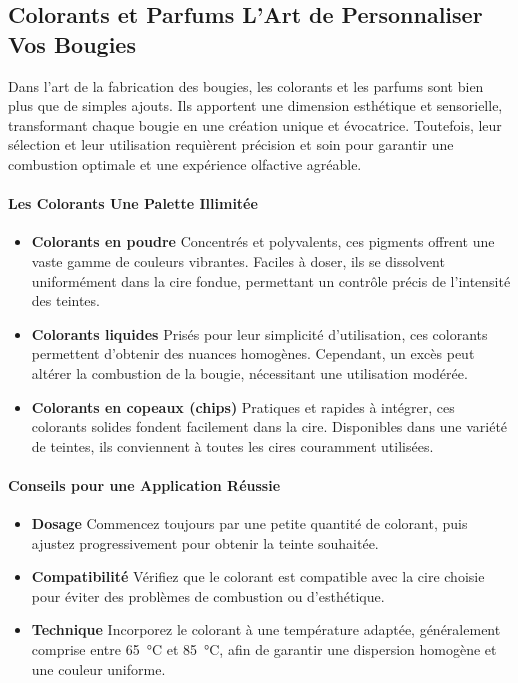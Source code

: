 \documentclass[11pt,fleqn,onecolumn,oneside]{book}
\begin{document}
\subsection*{Colorants et Parfums L’Art de Personnaliser Vos Bougies}

\begin{definition}
Dans l’art de la fabrication des bougies, les colorants et les parfums sont bien plus que de simples ajouts. Ils apportent une dimension esthétique et sensorielle, transformant chaque bougie en une création unique et évocatrice. Toutefois, leur sélection et leur utilisation requièrent précision et soin pour garantir une combustion optimale et une expérience olfactive agréable.
\end{definition}

\paragraph{Les Colorants Une Palette Illimitée}

\begin{itemize}
    \item \textbf{Colorants en poudre} Concentrés et polyvalents, ces pigments offrent une vaste gamme de couleurs vibrantes. Faciles à doser, ils se dissolvent uniformément dans la cire fondue, permettant un contrôle précis de l’intensité des teintes.
    \item \textbf{Colorants liquides} Prisés pour leur simplicité d’utilisation, ces colorants permettent d’obtenir des nuances homogènes. Cependant, un excès peut altérer la combustion de la bougie, nécessitant une utilisation modérée.
    \item \textbf{Colorants en copeaux (chips)} Pratiques et rapides à intégrer, ces colorants solides fondent facilement dans la cire. Disponibles dans une variété de teintes, ils conviennent à toutes les cires couramment utilisées.
\end{itemize}

\paragraph{Conseils pour une Application Réussie}
\begin{itemize}
    \item \textbf{Dosage} Commencez toujours par une petite quantité de colorant, puis ajustez progressivement pour obtenir la teinte souhaitée.
    \item \textbf{Compatibilité} Vérifiez que le colorant est compatible avec la cire choisie pour éviter des problèmes de combustion ou d’esthétique.
    \item \textbf{Technique} Incorporez le colorant à une température adaptée, généralement comprise entre \SI{65}{\degreeCelsius} et \SI{85}{\degreeCelsius}, afin de garantir une dispersion homogène et une couleur uniforme.
\end{itemize}
\end{document}
